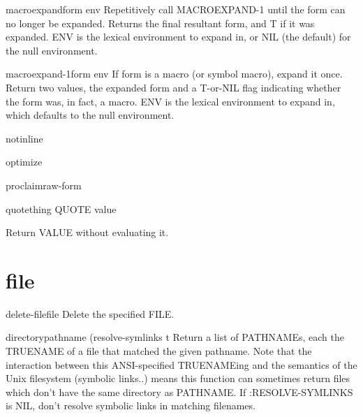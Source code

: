 \begin{function}{macroexpand}{form \op env}{}
  Repetitively call MACROEXPAND-1 until the form can no longer be expanded.
   Returns the final resultant form, and T if it was expanded. ENV is the
   lexical environment to expand in, or NIL (the default) for the null
   environment.
\end{function}

\begin{function}{macroexpand-1}{form \op env}{}
  If form is a macro (or symbol macro), expand it once. Return two values,
   the expanded form and a T-or-NIL flag indicating whether the form was, in
   fact, a macro. ENV is the lexical environment to expand in, which defaults
   to the null environment.
\end{function}

\begin{declaration}{notinline}{}{}
  
\end{declaration}

\begin{declaration}{optimize}{}{}
  
\end{declaration}

\begin{function}{proclaim}{raw-form}{}
  
\end{function}

\begin{specialop}{quote}{thing}{}
  QUOTE value

Return VALUE without evaluating it.
\end{specialop}

\section{file}

\begin{function}{delete-file}{file}{}
  Delete the specified FILE.
\end{function}

\begin{function}{directory}{pathname \key (resolve-symlinks t}{}
  Return a list of PATHNAMEs, each the TRUENAME of a file that matched the
   given pathname. Note that the interaction between this ANSI-specified
   TRUENAMEing and the semantics of the Unix filesystem (symbolic links..)
   means this function can sometimes return files which don't have the same
   directory as PATHNAME.  If :RESOLVE-SYMLINKS is NIL, don't resolve
   symbolic links in matching filenames.
\end{function}

